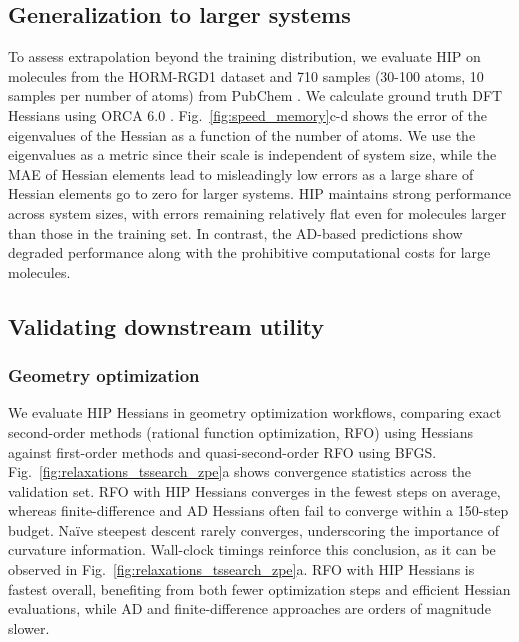 \documentclass[pdflatex,sn-mathphys-num]{sn-jnl}%
\theoremstyle{thmstyleone}%
\theoremstyle{thmstyletwo}%
\theoremstyle{thmstylethree}%
\begin{document}
\subsection{Generalization to larger systems}
To assess extrapolation beyond the training distribution, we evaluate HIP on molecules from the HORM-RGD1 dataset and 710 samples (30-100 atoms, 10 samples per number of atoms) from PubChem \citep{kim2025pubchem}. We calculate ground truth DFT Hessians using ORCA 6.0 \citep{ORCA}. Fig.~\ref{fig:speed_memory}c-d shows the error of the eigenvalues of the Hessian as a function of the number of atoms. We use the eigenvalues as a metric since their scale is independent of system size, while the MAE of Hessian elements lead to misleadingly low errors as a large share of Hessian elements go to zero for larger systems. 
HIP maintains strong performance across system sizes, with errors remaining relatively flat even for molecules larger than those in the training set. 
In contrast, the AD-based predictions show degraded performance along with the prohibitive computational costs for large molecules.


\subsection{Validating downstream utility}

\subsubsection{Geometry optimization}

We evaluate HIP Hessians in geometry optimization workflows, comparing exact second-order methods (rational function optimization, RFO) using Hessians against first-order methods and quasi-second-order RFO using BFGS.
Fig.~\ref{fig:relaxations_tssearch_zpe}a shows convergence statistics across the validation set. RFO with HIP Hessians converges in the fewest steps on average, whereas finite-difference and AD Hessians often fail to converge within a 150-step budget. Na\"ive steepest descent rarely converges, underscoring the importance of curvature information.
Wall-clock timings reinforce this conclusion, as it can be observed in Fig.~\ref{fig:relaxations_tssearch_zpe}a. RFO with HIP Hessians is fastest overall, benefiting from both fewer optimization steps and efficient Hessian evaluations, while AD and finite-difference approaches are orders of magnitude slower.
\end{document}
